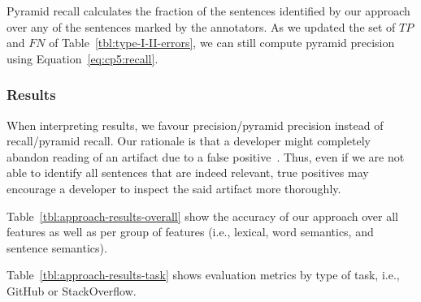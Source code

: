 \vspace{2mm}
Pyramid recall calculates the fraction of the sentences identified by our approach over 
any of the sentences marked by the annotators. As we updated the set of $TP$ and $FN$ of Table~\ref{tbl:type-I-II-errors}, we can still compute pyramid precision using Equation~\ref{eq:cp5:recall}.




\subsubsection{Results}


When interpreting results, we favour precision/pyramid precision instead of recall/pyramid recall.
Our rationale is that a developer might completely abandon reading of an artifact due to a false positive~\cite{Singer1998, Brandt2009a}.
Thus, even if we are not able to identify all sentences that are indeed relevant, true positives may encourage a developer to inspect the said artifact more thoroughly.




Table~\ref{tbl:approach-results-overall} show the accuracy of our approach 
over all features as well as per group of features (i.e., lexical, word semantics, and sentence semantics).






Table~\ref{tbl:approach-results-task} shows evaluation metrics by type of task, i.e., GitHub or StackOverflow.



